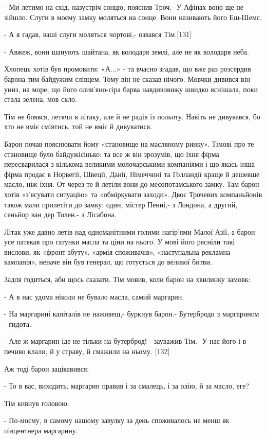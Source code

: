 - Ми летимо на схід. назустріч сонцю,-пояснив Троч.- У Афінах воно ще не зійшло. Слуги в моєму замку моляться на сонце. Вони називають його Еш-Шемс.

- А я гадав, ваші слуги моляться чортові,- озвався Тім.[131]

- Авжеж, вони шанують шайтана, як володаря землі, але не як володаря неба.

Хлопець хотів був промовити: «А...» - та вчасно згадав, що вже раз розсердив барона тим байдужим слівцем. Тому він не сказав нічого. Мовчки дивився він униз, на море, що його олив'яно-сіра барва навдивовижу швидко яснішала, поки стала зелена, мов скло.

Тім не боявся, летячи в літаку, але й не радів із польоту. Навіть не дивувався, бо хто не вміє сміятись. той не вміє й дивуватися.

Барон почав пояснювати йому «становище на масляному ринку». Тімові про те становище було байдужісінько: та все ж він зрозумів, що їхня фірма пересварилася з кількома великими молочарськими компаніями і що якась інша фірма продає в Норвегії, Швеції, Данії, Німеччині та Голландії краще й дешевше масло, ніж їхня. От через те й летіли вони до месопотамського замку. Там барон хотів «з'ясувати ситуацію» та «обміркувати заходи». Двоє Трочевих компаньйонів також мали прилетіти до замку: один, містер Пенні,- з Лондона, а другий, сеньйор ван дер Толен.- з Лісабона.

Літак уже давно летів над одноманітними голими нагір'ями Малої Азії, а барон усе патякав про гатунки масла та ціни на нього. У мові його рясніли такі вислови, як «фронт збуту», «армія споживачів», «наступальна рекламна кампанія», неначе він був генерал, що готується до великої битви.

Задля годиться, аби щось сказати. Тім мовив, коли барон на хвилинку замовк:

- А в нас удома ніколи не бувало масла, самий маргарин.

- На маргарині капіталів не наживеш,- буркнув барон.- Бутерброди з маргарином - гидота.

- Але ж маргарин іде не тільки на бутерброд! - зауважив Тім.- У нас його і в печиво клали, й у страву, й смажили на ньому. [132]

Аж тоді барон зацікавився:

- То в вас, виходить, маргарин правив і за смалець, і за олію, й за масло, еге?

Тім кивнув головою:

- По-моєму, в самому нашому завулку за день споживалось не менш як півцентнера маргарину.

